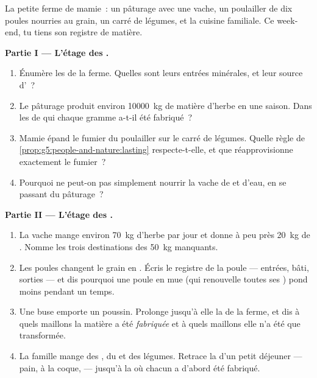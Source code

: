 \begin{problem}\label{pb:g6:matter-from-food:1}
La petite ferme de mamie~: un pâturage avec une vache, un poulailler
de dix poules nourries au grain, un carré de légumes, et la cuisine
familiale. Ce week-end, tu tiens son registre de matière.

\medskip\noindent\textbf{Partie I --- L'étage des .}
\begin{enumerate}
  \item Énumère les  de la ferme. Quelles sont leurs
        entrées minérales, et leur source d'~?
  \item Le pâturage produit environ \qty{10000}{kg} de matière
        d'herbe en une saison. Dans les  de qui chaque
        gramme a-t-il été fabriqué~?
  \item Mamie épand le fumier du poulailler sur le carré de légumes.
        Quelle règle de
        \cref{prop:g5:people-and-nature:lasting} respecte-t-elle, et
        que réapprovisionne exactement le fumier~?
  \item Pourquoi ne peut-on pas simplement nourrir la vache de  et d'eau, en se passant du pâturage~?
\end{enumerate}

\medskip\noindent\textbf{Partie II --- L'étage des .}
\begin{enumerate}[resume]
  \item La vache mange environ \qty{70}{kg} d'herbe par jour et
        donne à peu près \qty{20}{kg} de . Nomme les trois
        destinations des \qty{50}{kg} manquants.
  \item Les poules changent le grain en . Écris le registre de
        la poule --- entrées, bâti, sorties --- et dis pourquoi une
        poule en mue (qui renouvelle toutes ses ) pond moins
        pendant un temps.
  \item Une buse emporte un poussin. Prolonge jusqu'à elle la
         de la ferme, et dis à quels maillons la
        matière a été \emph{fabriquée} et à quels maillons elle n'a
        été que transformée.
  \item La famille mange des , du  et des légumes. Retrace
        la  d'un petit déjeuner --- pain,  à la
        coque,  --- jusqu'à la  où chacun a d'abord été
        fabriqué.
\end{enumerate}


\end{problem}
